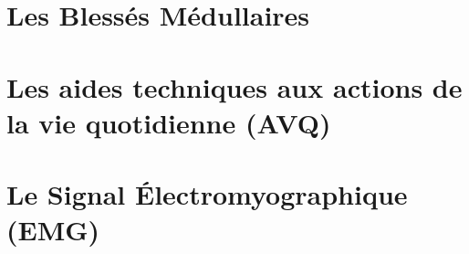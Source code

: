 \documentclass[letterpaper, twoside, 12pt, memoire, creativecommons, hyperref]{thETS}
\begin{document}


\section{Les Blessés Médullaires}

\section{Les aides techniques aux actions de la vie quotidienne (AVQ)}

\section{Le Signal Électromyographique (EMG)}
\end{document}
